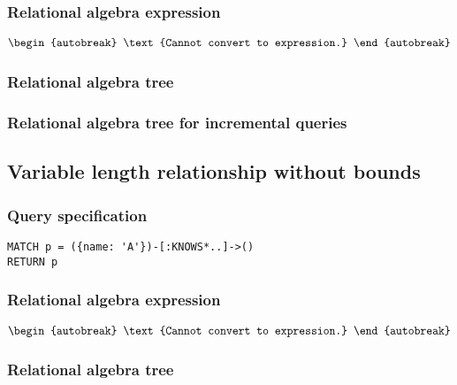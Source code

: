 \subsubsection*{Relational algebra expression}

\begin{align*}
\begin{autobreak}
\text{Cannot convert to expression.}
\end{autobreak}
\end{align*}

\subsubsection*{Relational algebra tree}


\subsubsection*{Relational algebra tree for incremental queries}


\subsection{Variable length relationship without bounds}

\subsubsection*{Query specification}

\begin{lstlisting}
MATCH p = ({name: 'A'})-[:KNOWS*..]->()
RETURN p
\end{lstlisting}

\subsubsection*{Relational algebra expression}

\begin{align*}
\begin{autobreak}
\text{Cannot convert to expression.}
\end{autobreak}
\end{align*}

\subsubsection*{Relational algebra tree}

